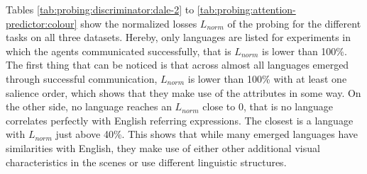 Tables \ref{tab:probing:discriminator:dale-2} to \ref{tab:probing:attention-predictor:colour} show the normalized losses $L_{norm}$ of the probing for the different tasks on all three datasets.
Hereby, only languages are listed for experiments in which the agents communicated successfully, that is $L_{norm}$ is lower than 100\%.
The first thing that can be noticed is that across almost all languages emerged through successful communication, $L_{norm}$ is lower than 100\% with at least one salience order, which shows that they make use of the attributes in some way.
On the other side, no language reaches an $L_{norm}$ close to 0, that is no language correlates perfectly with English referring expressions.
The closest is a language with $L_{norm}$ just above 40\%.
This shows that while many emerged languages have similarities with English, they make use of either other additional visual characteristics in the scenes or use different linguistic structures.

